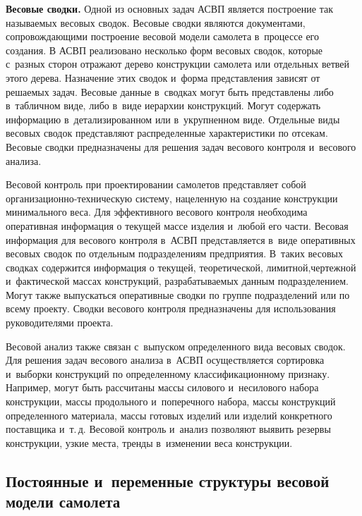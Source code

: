 \begin{multicols}{2}
  \textbf{Весовые сводки.} Одной из основных задач \mbox{АСВП} является 
построение так называемых весовых сводок. Весовые сводки являются 
документами, сопровождающими построение весовой модели самолета 
в~процессе его создания. В АСВП реализовано несколько форм весовых 
сводок, которые с~разных сторон отражают дерево конструкции самолета или 
отдельных ветвей этого дерева. Назначение этих сводок и~форма представления 
зависят от ре\-ша\-емых задач. Весовые данные в~сводках могут быть 
представлены либо в~табличном виде, либо в~виде иерархии конструкций. 
Могут содержать информацию в~детализированном или в~укрупненном виде. 
Отдельные виды весовых сводок пред\-став\-ля\-ют распределенные 
характеристики по отсекам. Весовые сводки предназначены для решения задач 
весового контроля и~весового анализа. 
  
  Весовой контроль при проектировании самолетов представляет собой  
ор\-га\-ни\-за\-ци\-он\-но-тех\-ническую сис\-те\-му, нацеленную на создание 
конструк\-ции минимального веса. Для эффективного \mbox{весового} контроля 
необходима оперативная информация о текущей массе изделия и~любой его 
части. Весовая информация для весового контроля в~АСВП представляется 
в~виде оперативных весовых сводок по отдельным подразделениям 
предприятия. В~таких весовых сводках содержится информация о текущей, 
теоретической, лимитной,\linebreak чертежной и~фактической массах конструкций, 
разрабатываемых данным подразделением. Могут также выпускаться 
оперативные сводки по группе подразделений или по всему проекту. Сводки 
весового контроля предназначены для использования руководителями проекта.
  
  Весовой анализ также связан с~выпуском определенного вида весовых 
сводок. Для решения задач весового анализа в~АСВП осуществляется 
сортировка и~выборки конструкций по определенному классификационному 
признаку. Например, могут быть рассчитаны массы силового и~несилового 
набора конструкции, массы продольного и~поперечного набора, массы 
конструкций определенного материала, массы готовых изделий или изделий 
конкретного поставщика и~т.\,д. Весовой контроль и~анализ позволяют 
выявить резервы конструкции, узкие места, тренды в~изменении веса 
кон\-ст\-рук\-ции.
{

}
  
  \subsection{Постоянные и~переменные структуры весовой модели 
самолета}
  

\end{multicols}
